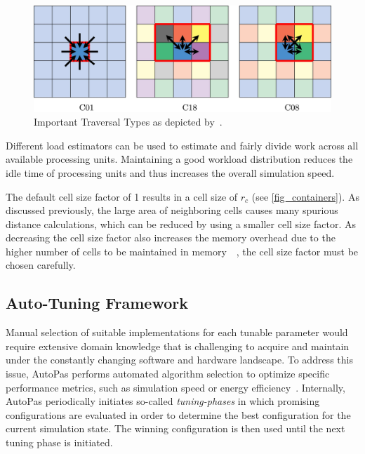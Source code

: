 \documentclass[conference]{IEEEtran}
\begin{document}
\begin{description}[style=nextline]
        \begin{figure}[H]
            \centering
            \includegraphics[width=\columnwidth]{figures/traversals.jpg}
            \caption{Important Traversal Types as depicted by~\cite{NEWCOME2023115278}.}
            \label{fig_traversals}
        \end{figure}

    \item[Load Estimator]
        Different load estimators can be used to estimate and fairly divide work across all available processing units. Maintaining a good workload distribution reduces the idle time of processing units and thus increases the overall simulation speed.

    \item[Cell Size Factor]
        The default cell size factor of 1 results in a cell size of $r_c$ (see \autoref{fig_containers}). As discussed previously, the large area of neighboring cells causes many spurious distance calculations, which can be reduced by using a smaller cell size factor. As decreasing the cell size factor also increases the memory overhead due to the higher number of cells to be maintained in memory~\cite{menges2019}~\cite{Papula2020}, the cell size factor must be chosen carefully.
\end{description}


\subsection{Auto-Tuning Framework}

Manual selection of suitable implementations for each tunable parameter would require extensive domain knowledge that is challenging to acquire and maintain under the constantly changing software and hardware landscape. To address this issue, AutoPas performs automated algorithm selection to optimize specific performance metrics, such as simulation speed or energy efficiency~\cite{Gratl2022AutoPas}. Internally, AutoPas periodically initiates so-called \textit{tuning-phases} in which promising configurations are evaluated in order to determine the best configuration for the current simulation state. The winning configuration is then used until the next tuning phase is initiated.
\end{document}
